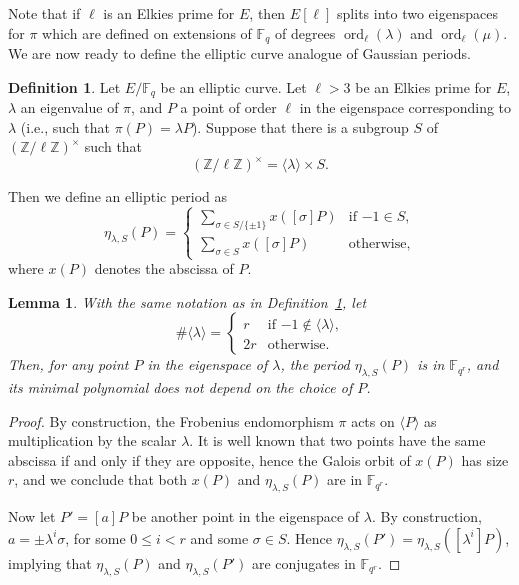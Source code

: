 \documentclass[12pt]{article}
\theoremstyle{plain}
\newtheorem{lemma}[theorem]{Lemma}
\theoremstyle{definition}
\newtheorem{definition}[theorem]{Definition}
\DeclareMathOperator{\order}{ord} %
\def\Z{\ensuremath{\mathbb{Z}}}
\def\F{\ensuremath{\mathbb{F}}}
\begin{document}
Note that if $\ell$ is an Elkies prime for $E$, then $E[\ell]$ splits
into two eigenspaces for $\pi$ which are defined on extensions of
$\F_q$ of degrees $\order_\ell(\lambda)$ and $\order_\ell(\mu)$. We
are now ready to define the elliptic curve analogue of Gaussian
periods.

\begin{definition}
  \label{definition:ellperiod}
  Let $E/\F_q$ be an elliptic curve.  Let $\ell > 3$ be an Elkies
  prime for $E$, $\lambda$ an eigenvalue of $\pi$, and $P$ a point of
  order $\ell$ in the eigenspace corresponding to $\lambda$ (i.e.,
  such that $\pi(P)=\lambda P$).  Suppose that there is a subgroup $S$
  of $(\Z/\ell\Z)^{\times}$ such that
  \begin{equation}
    (\Z/\ell\Z)^{\times} = \langle{\lambda}\rangle \times S.
  \end{equation}
  
  Then we define an elliptic period as
  \begin{equation}
    \eta_{\lambda,S}(P) =
    \begin{cases}
      \sum_{\sigma\in S/\{\pm1\}} {x \left([\sigma] P \right)} & \text{if $-1\in S$,}\\
      \sum_{\sigma\in S} {x \left([\sigma] P \right)} & \text{otherwise,}
    \end{cases}
  \end{equation}
  where $x(P)$ denotes the abscissa of $P$.
\end{definition}

\begin{lemma}
  \label{lemma:ellperiods-order}
  With the same notation as in Definition~\ref{definition:ellperiod},
  let
  \begin{equation*}
    \#\langle\lambda\rangle =
    \begin{cases}
      r & \text{if $-1\notin\langle\lambda\rangle$,}\\
      2r & \text{otherwise.}
    \end{cases}
  \end{equation*}
  Then, for any point $P$ in the eigenspace of $\lambda$, the period
  $\eta_{\lambda,S}(P)$ is in $\F_{q^r}$, and its minimal polynomial
  does not depend on the choice of $P$.
\end{lemma}
\begin{proof}
  By construction, the Frobenius endomorphism $\pi$ acts on
  $\langle P\rangle$ as multiplication by the scalar $\lambda$. It is
  well known that two points have the same abscissa if and only if
  they are opposite, hence the Galois orbit of $x(P)$ has size $r$,
  and we conclude that both $x(P)$ and $\eta_{\lambda,S}(P)$ are in
  $\F_{q^r}$.

  Now let $P'=[a]P$ be another point in the eigenspace of
  $\lambda$. By construction, $a=\pm \lambda^i\sigma$, for some
  $0\le i<r$ and some $\sigma\in S$. Hence
  $\eta_{\lambda,S}(P')=\eta_{\lambda,S}([\lambda^i]P)$, implying that
  $\eta_{\lambda,S}(P)$ and $\eta_{\lambda,S}(P')$ are conjugates in
  $\F_{q^r}$.
\end{proof}
\end{document}
